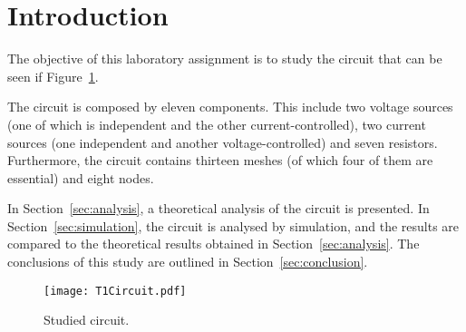 \section{Introduction}
\label{sec:introduction}

The objective of this laboratory assignment is to study the circuit that can be seen if Figure~\ref{fig:T1Circuit}.
 
The circuit is composed by eleven components. This include two voltage sources (one of which is independent and the other current-controlled), two current sources (one independent and another voltage-controlled) and seven resistors. Furthermore, the circuit contains thirteen meshes (of which four of them are essential) and eight nodes.

In Section~\ref{sec:analysis}, a theoretical analysis of the circuit is
presented. In Section~\ref{sec:simulation}, the circuit is analysed by
simulation, and the results are compared to the theoretical results obtained in Section~\ref{sec:analysis}. The conclusions of this study are outlined in
Section~\ref{sec:conclusion}.

\vspace{4.0cm}

\begin{figure}[h] \centering
\texttt{[image: T1Circuit.pdf]}
\caption{Studied circuit.}
\label{fig:T1Circuit}
\end{figure}
